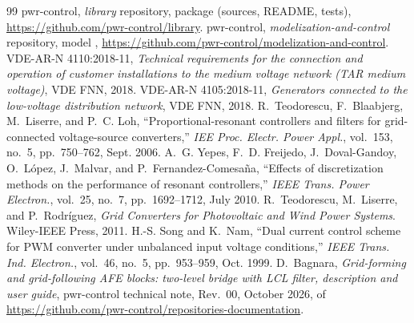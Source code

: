 \documentclass[11pt,a4paper]{scrartcl}
\begin{document}
\begin{onehalfspace}
\begin{thebibliography}{99}
	 pwr-control, \textit{library} repository, package  (sources, README, tests), \url{https://github.com/pwr-control/library}.
	 pwr-control, \textit{modelization-and-control} repository, model , \url{https://github.com/pwr-control/modelization-and-control}.
	 VDE-AR-N 4110:2018-11, \textit{Technical requirements for the connection and operation of customer installations to the medium voltage network (TAR medium voltage)}, VDE FNN, 2018.
	 VDE-AR-N 4105:2018-11, \textit{Generators connected to the low-voltage distribution network}, VDE FNN, 2018.
	 R.~Teodorescu, F.~Blaabjerg, M.~Liserre, and P.~C. Loh, ``Proportional-resonant controllers and filters for grid-connected voltage-source converters,'' \emph{IEE Proc. Electr. Power Appl.}, vol.~153, no.~5, pp.~750--762, Sept. 2006.
	 A.~G. Yepes, F.~D. Freijedo, J.~Doval-Gandoy, O.~L\'opez, J.~Malvar, and P.~Fernandez-Comesa\~na, ``Effects of discretization methods on the performance of resonant controllers,'' \emph{IEEE Trans. Power Electron.}, vol.~25, no.~7, pp.~1692--1712, July 2010.
	 R.~Teodorescu, M.~Liserre, and P.~Rodr\'iguez, \emph{Grid Converters for Photovoltaic and Wind Power Systems}. Wiley-IEEE Press, 2011.
	 H.-S. Song and K.~Nam, ``Dual current control scheme for PWM converter under unbalanced input voltage conditions,'' \emph{IEEE Trans. Ind. Electron.}, vol.~46, no.~5, pp.~953--959, Oct. 1999.
	 D.~Bagnara, \textit{Grid-forming and grid-following AFE blocks: two-level bridge with LCL filter, description and user guide}, pwr-control technical note, Rev.~00, October 2026,  of \url{https://github.com/pwr-control/repositories-documentation}.
\end{thebibliography}

\end{onehalfspace}
\end{document}
